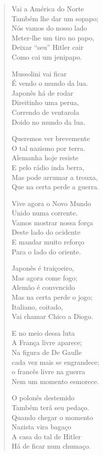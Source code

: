 \begin{verse}
Vai a América do Norte\\
Também lhe dar um sopapo;\\
Nós vamos do nosso lado\\
Meter-lhe um tiro no papo,\\
Deixar “seu” Hitler cair\\
Como cai um jenipapo.

Mussolini vai ficar\\
É vendo o mundo da lua.\\
Japonês há de rodar\\
Direitinho uma perua,\\
Correndo de ventarola\\
Doido no mundo da lua.

Queremos ver brevemente\\
O tal nazismo por terra.\\
Alemanha hoje resiste\\
E pelo rádio inda berra,\\
Mas pode arrumar a trouxa,\\
Que na certa perde a guerra.
\pagebreak

Vive agora o Novo Mundo\\
Unido numa corrente.\\
Vamos mostrar nossa força\\
Deste lado do ocidente\\
E mandar muito reforço\\
Para o lado do oriente.

Japonês é traiçoeiro,\\
Mas agora come fogo;\\
Alemão é convencido\\
Mas na certa perde o jogo;\\
Italiano, coitado,\\
Vai chamar Chico a Diogo.

E no meio dessa luta\\
A França livre aparece;\\
Na figura de De Gaulle\\
cada vez mais se engrandece;\\
o francês livre na guerra\\
Nem um momento esmorece.

O polonês destemido\\
Também terá seu pedaço.\\
Quando chegar o momento\\
Nazista vira bagaço\\
A casa do tal de Hitler\\
Há de ficar num chumaço.
\pagebreak


\end{verse}
